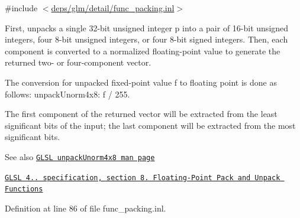 {\ttfamily \#include $<$\hyperlink{func__packing_8inl}{deps/glm/detail/func\+\_\+packing.\+inl}$>$}

First, unpacks a single 32-\/bit unsigned integer p into a pair of 16-\/bit unsigned integers, four 8-\/bit unsigned integers, or four 8-\/bit signed integers. Then, each component is converted to a normalized floating-\/point value to generate the returned two-\/ or four-\/component vector.

The conversion for unpacked fixed-\/point value f to floating point is done as follows\+: unpack\+Unorm4x8\+: f / 255.

The first component of the returned vector will be extracted from the least significant bits of the input; the last component will be extracted from the most significant bits.

\begin{DoxySeeAlso}{See also}
\href{http://www.opengl.org/sdk/docs/manglsl/xhtml/unpackUnorm4x8.xml}{\tt G\+L\+SL unpack\+Unorm4x8 man page} 

\href{http://www.opengl.org/registry/doc/GLSLangSpec.4.20.8.pdf}{\tt G\+L\+SL 4.. specification, section 8. Floating-\/\+Point Pack and Unpack Functions} 
\end{DoxySeeAlso}


Definition at line 86 of file func\+\_\+packing.\+inl.

